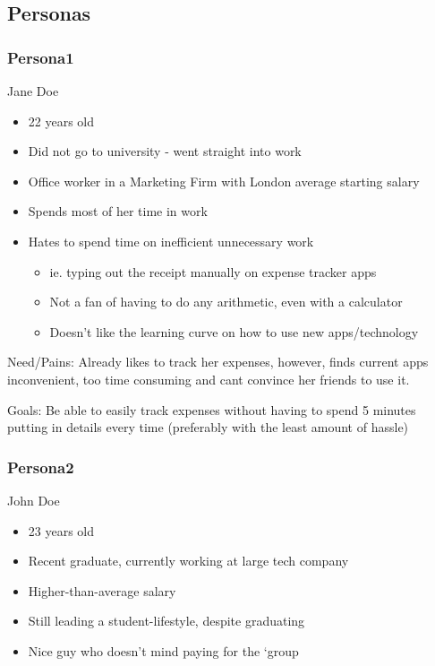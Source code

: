 \documentclass[a4wide, 11pt]{article}
\begin{document}
\subsection{Personas}
\label{persona}
\subsubsection{Persona1}
Jane Doe
\begin{itemize}
  \item 22 years old
  \item Did not go to university - went straight into work
  \item Office worker in a Marketing Firm with London average starting salary
  \item Spends most of her time in work 
  \item Hates to spend time on inefficient unnecessary work
  \begin{itemize}
    \item ie. typing out the receipt manually on expense tracker apps
    \item Not a fan of having to do any arithmetic, even with a calculator
    \item Doesn’t like the learning curve on how to use new apps/technology
  \end{itemize}
\end{itemize}
  
Need/Pains: Already likes to track her expenses, however, finds current apps inconvenient, too time consuming and cant convince her friends to use it.

Goals: Be able to easily track expenses without having to spend 5 minutes putting in details every time (preferably with the least amount of hassle)


\subsubsection{Persona2}
John Doe

\begin{itemize}
  \item 23 years old
  \item Recent graduate, currently working at large tech company
  \item Higher-than-average salary
  \item Still leading a student-lifestyle, despite graduating
  \item Nice guy who doesn’t mind paying for the `group
\end{itemize}
\end{document}

